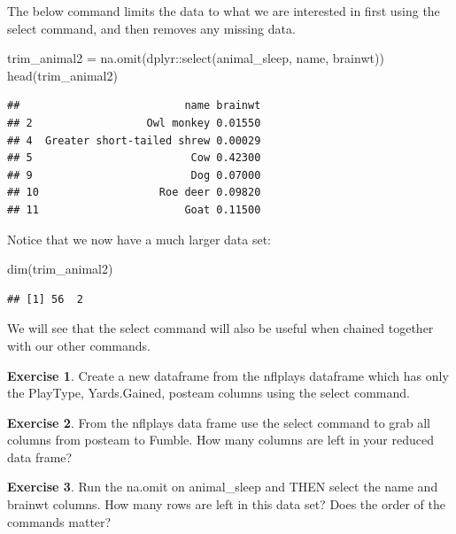 \documentclass[
]{book}
\newenvironment{Shaded}{\begin{snugshade}}{\end{snugshade}}
\newcommand{\FunctionTok}[1]{\textcolor[rgb]{0.00,0.00,0.00}{#1}}
\newcommand{\NormalTok}[1]{#1}
\newcommand{\OtherTok}[1]{\textcolor[rgb]{0.56,0.35,0.01}{#1}}
\newcommand{\SpecialCharTok}[1]{\textcolor[rgb]{0.00,0.00,0.00}{#1}}
\theoremstyle{definition}
\theoremstyle{definition}
\theoremstyle{definition}
\newtheorem{exercise}{Exercise}[chapter]
\theoremstyle{definition}
\theoremstyle{remark}
\begin{document}
The below command limits the data to what we are interested in first using the select command, and then removes any missing data.

\begin{Shaded}
\begin{Highlighting}[]
\NormalTok{trim\_animal2 }\OtherTok{=} \FunctionTok{na.omit}\NormalTok{(dplyr}\SpecialCharTok{::}\FunctionTok{select}\NormalTok{(animal\_sleep, name, brainwt))}
\FunctionTok{head}\NormalTok{(trim\_animal2)}
\end{Highlighting}
\end{Shaded}

\begin{verbatim}
##                          name brainwt
## 2                  Owl monkey 0.01550
## 4  Greater short-tailed shrew 0.00029
## 5                         Cow 0.42300
## 9                         Dog 0.07000
## 10                   Roe deer 0.09820
## 11                       Goat 0.11500
\end{verbatim}

Notice that we now have a much larger data set:

\begin{Shaded}
\begin{Highlighting}[]
\FunctionTok{dim}\NormalTok{(trim\_animal2)}
\end{Highlighting}
\end{Shaded}

\begin{verbatim}
## [1] 56  2
\end{verbatim}

We will see that the select command will also be useful when chained together with our other commands.

\begin{exercise}
\protect\hypertarget{exr:unnamed-chunk-142}{}\label{exr:unnamed-chunk-142}Create a new dataframe from the nflplays dataframe which has only the PlayType, Yards.Gained, posteam columns using the select command.
\end{exercise}

\begin{exercise}
\protect\hypertarget{exr:unnamed-chunk-143}{}\label{exr:unnamed-chunk-143}From the nflplays data frame use the select command to grab all columns from posteam to Fumble. How many columns are left in your reduced data frame?
\end{exercise}

\begin{exercise}
\protect\hypertarget{exr:unnamed-chunk-144}{}\label{exr:unnamed-chunk-144}Run the na.omit on animal\_sleep and THEN select the name and brainwt columns. How many rows are left in this data set? Does the order of the commands matter?
\end{exercise}
\end{document}
